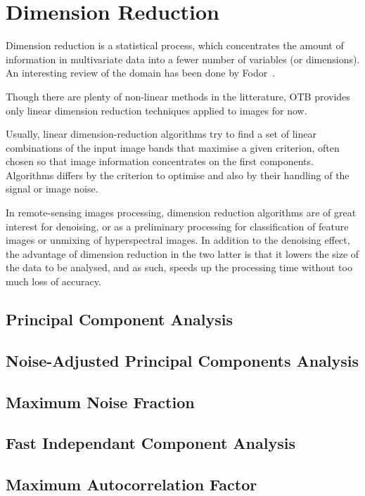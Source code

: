 \chapter{Dimension Reduction}\label{chap:dimred}

Dimension reduction is a statistical process, which concentrates the
amount of information in multivariate data into a fewer number of
variables (or dimensions). An interesting review of the domain has been done by Fodor~\cite{Fodor2002dimensionred}.

Though there are plenty of non-linear methods in the litterature, OTB
provides only linear dimension reduction techniques applied to images for now.

Usually, linear dimension-reduction algorithms try to find a set of
linear combinations of the input image bands that maximise a given
criterion, often chosen so that image information concentrates on the
first components. Algorithms differs by the criterion to optimise and
also by their handling of the signal or image noise.

In remote-sensing images processing, dimension reduction algorithms
are of great interest for denoising, or as a preliminary processing
for classification of feature images or unmixing of hyperspectral
images. In addition to the denoising effect, the advantage of
dimension reduction in the two latter is that it lowers the size of
the data to be analysed, and as such, speeds up the processing time
without too much loss of accuracy.

\section{Principal Component Analysis}



\section{Noise-Adjusted Principal Components Analysis}



\section{Maximum Noise Fraction}



\section{Fast Independant Component Analysis}



\section{Maximum Autocorrelation Factor}




